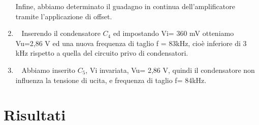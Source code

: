 \documentclass[a4paper]{article}
\begin{document}
\begin{enumerate}[label=\alph*.]
					Infine, abbiamo determinato il guadagno in continua dell'amplificatore tramite l'applicazione di offset.
				\item \ 
					\newline
					Inserendo il condensatore $ C_{4} $ ed impostando Vi= 360 mV otteniamo Vu=2,86 V ed una nuova frequenza di taglio f = 83kHz, cioè inferiore di 3 kHz rispetto a quella del circuito privo di condensatori. 
				\item \ 
					\newline
					Abbiamo inserito $ C_{5} $, Vi invariata, Vu= 2,86 V, quindi il condensatore non influenza la tensione di ucita, e frequenza di taglio f= 84kHz.
			\end{enumerate}
	\section{Risultati}
\end{document}
